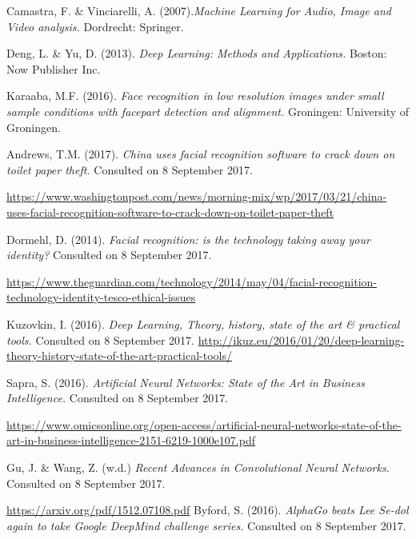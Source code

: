 \documentclass[12pt, titlepage]{article}
\begin{document}
    
    \begin{thebibliography}{99}
        Camastra, F. \& Vinciarelli, A. (2007).\textit{Machine Learning for Audio, Image and Video analysis.} Dordrecht: Springer.
        
        Deng, L. \& Yu, D. (2013). \textit{Deep Learning: Methods and Applications.} Boston: Now Publisher Inc.
        
        Karaaba, M.F. (2016). \textit{Face recognition in low resolution images under small sample conditions with facepart detection and alignment.} Groningen: University of Groningen.
        
        Andrews, T.M. (2017). \textit{China uses facial recognition software to crack down on toilet paper theft.} Consulted on 8 September 2017.
        
        \url{https://www.washingtonpost.com/news/morning-mix/wp/2017/03/21/china-uses-facial-recognition-software-to-crack-down-on-toilet-paper-theft}
        
        Dormehl, D. (2014). \textit{Facial recognition: is the technology taking away your identity?} Consulted on 8 September 2017.
        
        \url{https://www.theguardian.com/technology/2014/may/04/facial-recognition-technology-identity-tesco-ethical-issues}
        
        Kuzovkin, I. (2016). \textit{Deep Learning, Theory, history, state of the art \& practical tools.} Consulted on 8 September 2017.
        \url{http://ikuz.eu/2016/01/20/deep-learning-theory-history-state-of-the-art-practical-tools/}
        
        
        Sapra, S. (2016). \textit{Artificial Neural Networks: State of the Art in Business Intelligence.} Consulted on 8 September 2017.
        
        \url{https://www.omicsonline.org/open-access/artificial-neural-networks-state-of-the-art-in-business-intelligence-2151-6219-1000e107.pdf}
        
        Gu, J. \& Wang, Z. (w.d.) \textit{Recent Advances in Convolutional Neural Networks.} Consulted on 8 September 2017.
        
        \url{https://arxiv.org/pdf/1512.07108.pdf}
        Byford, S. (2016). \textit{AlphaGo beats Lee Se-dol again to take Google DeepMind challenge series.} Consulted on 8 September 2017.
        

\end{thebibliography}
\end{document}
